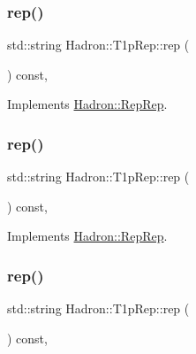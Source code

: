 \subsubsection{\texorpdfstring{rep()}{rep()}\hspace{0.1cm}{\footnotesize\ttfamily [1/3]}}
{\footnotesize\ttfamily std\+::string Hadron\+::\+T1p\+Rep\+::rep (\begin{DoxyParamCaption}{ }\end{DoxyParamCaption}) const\hspace{0.3cm}{\ttfamily [inline]}, {\ttfamily [virtual]}}



Implements \mbox{\hyperlink{structHadron_1_1RepRep_ab3213025f6de249f7095892109575fde}{Hadron\+::\+Rep\+Rep}}.

\mbox{\label{structHadron_1_1T1pRep_a2cdc4017e6c5a92d190bc873e44361fe}} 
\subsubsection{\texorpdfstring{rep()}{rep()}\hspace{0.1cm}{\footnotesize\ttfamily [2/3]}}
{\footnotesize\ttfamily std\+::string Hadron\+::\+T1p\+Rep\+::rep (\begin{DoxyParamCaption}{ }\end{DoxyParamCaption}) const\hspace{0.3cm}{\ttfamily [inline]}, {\ttfamily [virtual]}}



Implements \mbox{\hyperlink{structHadron_1_1RepRep_ab3213025f6de249f7095892109575fde}{Hadron\+::\+Rep\+Rep}}.

\mbox{\label{structHadron_1_1T1pRep_a2cdc4017e6c5a92d190bc873e44361fe}} 
\subsubsection{\texorpdfstring{rep()}{rep()}\hspace{0.1cm}{\footnotesize\ttfamily [3/3]}}
{\footnotesize\ttfamily std\+::string Hadron\+::\+T1p\+Rep\+::rep (\begin{DoxyParamCaption}{ }\end{DoxyParamCaption}) const\hspace{0.3cm}{\ttfamily [inline]}, {\ttfamily [virtual]}}



